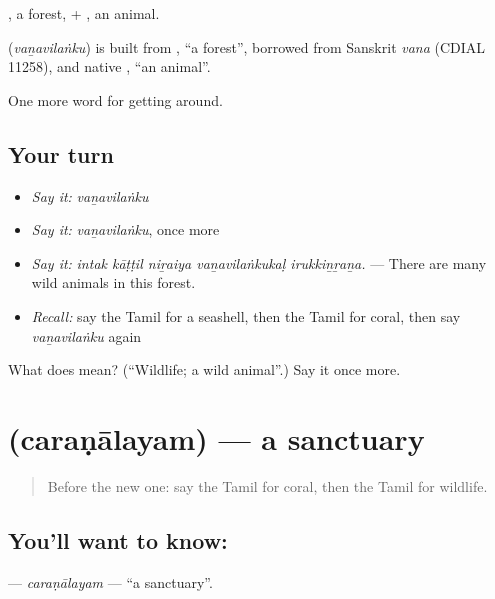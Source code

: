 , a forest, + , an animal.

\begin{cousinweb}
\textbf{} (\emph{vaṉavilaṅku}) is built from , \textquotedblleft{}a forest\textquotedblright{}, borrowed from Sanskrit \emph{vana} (CDIAL 11258), and native , \textquotedblleft{}an animal\textquotedblright{}.
\end{cousinweb}

\begin{grammarlens}[title={What you've built}]
One more word for getting around.
\end{grammarlens}

\subsection*{Your turn}
\begin{itemize}
\raggedright
  \item \emph{Say it:} \emph{vaṉavilaṅku}
  \item \emph{Say it:} \emph{vaṉavilaṅku}, once more
  \item \emph{Say it:} \emph{intak kāṭṭil niṟaiya vaṉavilaṅkukaḷ irukkiṉṟaṉa.} — There are many wild animals in this forest.
  \item \emph{Recall:} say the Tamil for a seashell, then the Tamil for coral, then say \emph{vaṉavilaṅku} again
\end{itemize}

\begin{tcolorbox}[breakable,colback=teal!4,colframe=teal!35!black,title={Before you move on}]
What does  mean? (\textquotedblleft{}Wildlife; a wild animal\textquotedblright{}.) Say it once more.
\end{tcolorbox}
\section[\texorpdfstring{\ta{சரணாலயம்} (caraṇālayam)}{சரணாலயம் (caraṇālayam)}]{ (caraṇālayam) — a sanctuary}

\label{lesson:TA-C437-caranalayam}



\begin{quote}
Before the new one: say the Tamil for coral, then the Tamil for wildlife.
\end{quote}

\subsection*{You'll want to know: }
\textbf{} — \emph{caraṇālayam} — \textquotedblleft{}a sanctuary\textquotedblright{}.

